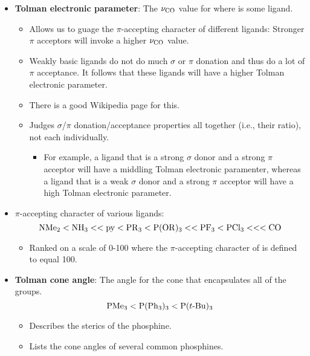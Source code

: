 \documentclass[../notes.tex]{subfiles}
\begin{document}
\begin{itemize}
    \item \textbf{Tolman electronic parameter}: The $\nu_{\ce{CO}}$ value for  where  is some ligand.
    \begin{itemize}
        \item Allows us to guage the $\pi$-accepting character of different ligands: Stronger $\pi$ acceptors will invoke a higher $\nu_{\ce{CO}}$ value.
        \item Weakly basic ligands do not do much $\sigma$ or $\pi$ donation and thus do a lot of $\pi$ acceptance. It follows that these ligands will have a higher Tolman electronic parameter.
        \item There is a good Wikipedia page for this.
        \item Judges $\sigma$/$\pi$ donation/acceptance properties all together (i.e., their ratio), not each individually.
        \begin{itemize}
            \item For example, a ligand that is a strong $\sigma$ donor and a strong $\pi$ acceptor will have a middling Tolman electronic paramenter, whereas a ligand that is a weak $\sigma$ donor and a strong $\pi$ acceptor will have a high Tolman electronic parameter.
        \end{itemize}
    \end{itemize}
    \item $\pi$-accepting character of various ligands:
    \begin{equation*}
        \ce{NMe2}
        < \ce{NH3}
        << \ce{py}
        < \ce{PR3}
        < \ce{P(OR)3}
        << \ce{PF3}
        < \ce{PCl3}
        <<< \ce{CO}
    \end{equation*}
    \begin{itemize}
        \item Ranked on a scale of 0-100 where the $\pi$-accepting character of  is defined to equal 100.
    \end{itemize}
    \item \textbf{Tolman cone angle}: The angle for the cone that encapsulates all of the  groups.
    \begin{equation*}
        \ce{PMe3}
        < \ce{P(Ph3)3}
        < \ce{P($t${-}Bu)3}
    \end{equation*}
    \begin{itemize}
        \item Describes the sterics of the phosphine.
        \item Lists the cone angles of several common phosphines.

\end{itemize}
\end{itemize}
\end{document}
